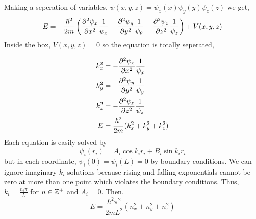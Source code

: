 \documentclass[12pt]{extarticle}
\begin{document}
\begin{enumerate}
Making a seperation of variables, $\psi(x, y, z) = \psi_x(x) \psi_y(y) \psi_z(z)$ we get, 
\[E = -\frac{\hbar^2}{2m} \left(\frac{\partial^2{\psi_x}}{\partial{x}^2} \frac{1}{\psi_x} + \frac{\partial^2{\psi_y}}{\partial{y}^2} \frac{1}{\psi_\theta} + \frac{\partial^2{\psi_z}}{\partial{z}^2} \frac{1}{\psi_z} \right) + V(x,y,z) \]
Inside the box, $V(x, y, z) = 0$ so the equation is totally seperated, 

\begin{align*}
k_x^2 &= -\frac{\partial^2{\psi_x}}{\partial{x}^2} \frac{1}{\psi_x} \\
k_y^2 &= -\frac{\partial^2{\psi_y}}{\partial{y}^2} \frac{1}{\psi_y} \\
k_z^2 &= -\frac{\partial^2{\psi_z}}{\partial{z}^2} \frac{1}{\psi_z} \\
E &= \frac{\hbar^2}{2m} (k_x^2 + k_y^2 + k_z^2)
\end{align*} 
Each equation is easily solved by \[\psi_i(r_i) = A_i \cos{k_i r_i} + B_i \sin{k_i r_i}\] but in each coordinate, $\psi_i(0) = \psi_i(L) = 0$ by boundary conditions. We can ignore imaginary $k_i$ solutions because rising and falling exponentials cannot be zero at more than one point which violates the boundary conditions. Thus, $k_i = \frac{n_i \pi}{L}$ for $n \in \mathbb{Z}^{+}$ and $A_i = 0$. Then, \[E = \frac{\hbar^2 \pi^2}{2m L^2}\left(n_x^2 + n_y^2 + n_z^2 \right) \]


\end{enumerate}
\end{document}

